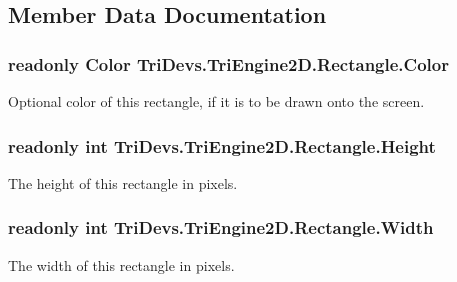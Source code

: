 \subsection{Member Data Documentation}
\hypertarget{struct_tri_devs_1_1_tri_engine2_d_1_1_rectangle_a1638cf0774ee3ac981f8d517a857f720}{
\subsubsection[{Color}]{\setlength{\rightskip}{0pt plus 5cm}readonly {\bf Color} Tri\-Devs.\-Tri\-Engine2\-D.\-Rectangle.\-Color}}\label{struct_tri_devs_1_1_tri_engine2_d_1_1_rectangle_a1638cf0774ee3ac981f8d517a857f720}


Optional color of this rectangle, if it is to be drawn onto the screen. 

\hypertarget{struct_tri_devs_1_1_tri_engine2_d_1_1_rectangle_a955ba67d04f81e6f30a983cd579d4509}{
\subsubsection[{Height}]{\setlength{\rightskip}{0pt plus 5cm}readonly int Tri\-Devs.\-Tri\-Engine2\-D.\-Rectangle.\-Height}}\label{struct_tri_devs_1_1_tri_engine2_d_1_1_rectangle_a955ba67d04f81e6f30a983cd579d4509}


The height of this rectangle in pixels. 

\hypertarget{struct_tri_devs_1_1_tri_engine2_d_1_1_rectangle_a0e6a4faf2c4ba9c9284d7715ae9a555c}{
\subsubsection[{Width}]{\setlength{\rightskip}{0pt plus 5cm}readonly int Tri\-Devs.\-Tri\-Engine2\-D.\-Rectangle.\-Width}}\label{struct_tri_devs_1_1_tri_engine2_d_1_1_rectangle_a0e6a4faf2c4ba9c9284d7715ae9a555c}


The width of this rectangle in pixels. 

